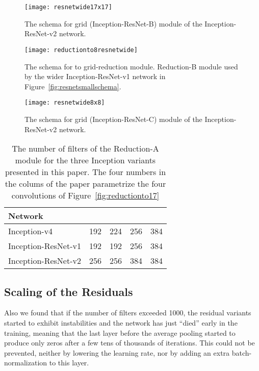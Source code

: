 \documentclass[10pt,twocolumn,letterpaper]{article}
\begin{document}
\begin{figure}
\centering
\texttt{[image: resnetwide17x17]}
\caption{The schema for  grid (Inception-ResNet-B) module of the
  Inception-ResNet-v2  network.}
\label{fig:resnetwide17x17module}
\end{figure}
\begin{figure}
\centering
\texttt{[image: reductionto8resnetwide]}
\caption{The schema for  to  grid-reduction module.
  Reduction-B module used by the wider Inception-ResNet-v1 network
  in Figure~\ref{fig:resnetsmallschema}.
}
\label{fig:reductionto8resnetwide}
\end{figure}
\begin{figure}
\centering
\texttt{[image: resnetwide8x8]}
\caption{The schema for  grid  (Inception-ResNet-C) module of the
 Inception-ResNet-v2 network.}
\label{fig:resnetwide8x8module}
\end{figure}
\begin{table}
{\small
 \begin{center}
   \begin{tabular}[H]{|l|c|c|c|c|}
   \hline
   {\bf Network} & {} & {} & {} & {} \\
   \hline
   Inception-v4 & 192 & 224 & 256 & 384 \\
   Inception-ResNet-v1 & 192 & 192 & 256 & 384 \\
   Inception-ResNet-v2 & 256 & 256 & 384 & 384 \\
   \hline
   \end{tabular}
 \end{center}
 }
\caption{The number of filters of the Reduction-A module for the three
  Inception variants presented in this paper. The four numbers in the
  colums of the paper parametrize the four convolutions of Figure~\ref{fig:reductionto17} }
\label{reductionto17params}
\end{table}

\subsection{Scaling of the Residuals}
Also we found that if the number of filters exceeded 1000, the residual
variants started to exhibit instabilities and the network has just
``died'' early in the training, meaning that the last layer before the
average pooling started to produce only zeros after a few tens of thousands of
iterations. This could not be prevented, neither by lowering the learning
rate, nor by adding an extra batch-normalization to this layer.
\end{document}
